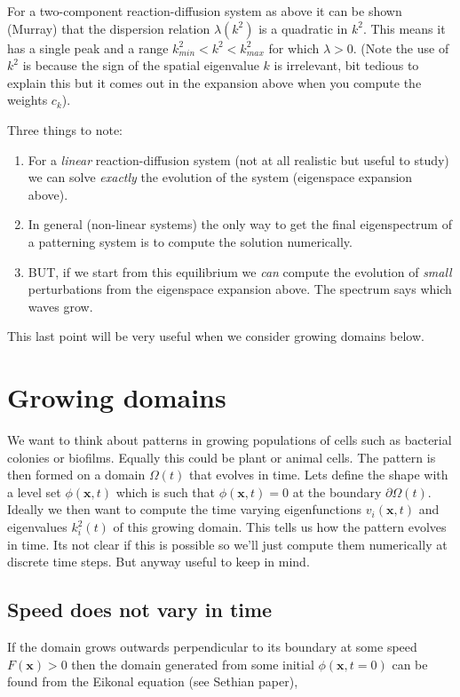 \documentclass{article}
\renewcommand{\vec}[1]{\mathbf{#1}}
\begin{document}
For a two-component reaction-diffusion system as above it can be shown (Murray)
that the dispersion relation $\lambda(k^2)$ is a quadratic in $k^2$. This means it
has a single peak and a range $k^2_{min}<k^2<k^2_{max}$ for which $\lambda>0$.
(Note the use of $k^2$ is because the sign of the spatial eigenvalue $k$ is
irrelevant, bit tedious to explain this but it comes out in the expansion above
when you compute the weights $c_k$).

Three things to note:
\begin{enumerate}
\item For a \textit{linear} reaction-diffusion system (not at all realistic
but useful to study) we can solve \textit{exactly} the evolution of the system
(eigenspace expansion above).
\item In general (non-linear systems) the only way to get the final eigenspectrum 
of a patterning system is to compute the solution numerically.
\item BUT, if we start from this equilibrium we \textit{can} compute the
evolution of \textit{small} perturbations from the eigenspace expansion above.
The spectrum says which waves grow.
\end{enumerate}

This last point will be very useful when we consider growing domains below.

\section{Growing domains}
We want to think about patterns in growing populations of cells such as
bacterial colonies or biofilms. Equally this could be plant or animal cells. The
pattern is then formed on a domain $\Omega(t)$ that evolves in time. Lets define
the shape with a level set $\phi(\vec{x},t)$ which is such that
$\phi(\vec{x},t)=0$ at the boundary $\partial \Omega(t)$.  Ideally we then want
to compute the time varying eigenfunctions $v_i(\vec{x},t)$ and eigenvalues
$k_i^2(t)$ of this growing domain.  This tells us how the pattern evolves in
time. Its not clear if this is possible so we'll just compute them numerically
at discrete time steps. But anyway useful to keep in mind.

\subsection{Speed does not vary in time}
If the domain grows outwards perpendicular to its boundary at some speed
$F(\vec{x})>0$ then the domain generated from some initial $\phi(\vec{x},t=0)$
can be found from the Eikonal equation (see Sethian paper),
\end{document}

